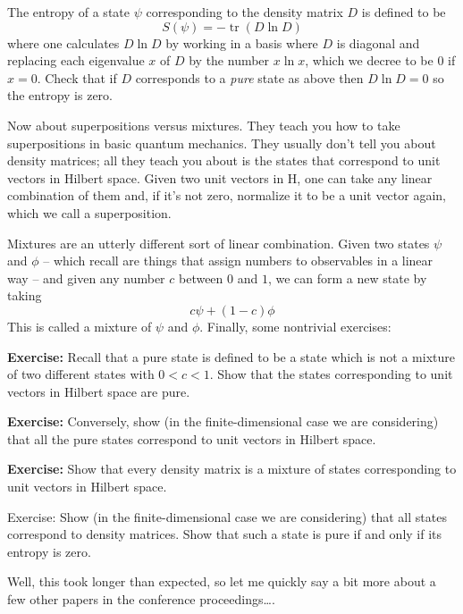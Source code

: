 \documentclass[12pt]{article}
\begin{document}
The entropy of a state \(\psi\) corresponding to the density matrix
\(D\) is defined to be \[S(\psi) = -\operatorname{tr}(D \ln D)\] where
one calculates \(D \ln D\) by working in a basis where \(D\) is diagonal
and replacing each eigenvalue \(x\) of \(D\) by the number \(x \ln x\),
which we decree to be \(0\) if \(x = 0\). Check that if \(D\)
corresponds to a \emph{pure} state as above then \(D \ln D = 0\) so the
entropy is zero.

Now about superpositions versus mixtures. They teach you how to take
superpositions in basic quantum mechanics. They usually don't tell you
about density matrices; all they teach you about is the states that
correspond to unit vectors in Hilbert space. Given two unit vectors in
H, one can take any linear combination of them and, if it's not zero,
normalize it to be a unit vector again, which we call a superposition.

Mixtures are an utterly different sort of linear combination. Given two
states \(\psi\) and \(\phi\) -- which recall are things that assign
numbers to observables in a linear way -- and given any number \(c\)
between \(0\) and \(1\), we can form a new state by taking
\[c \psi + (1-c) \phi\] This is called a mixture of \(\psi\) and
\(\phi\). Finally, some nontrivial exercises:

\textbf{Exercise:} Recall that a pure state is defined to be a state
which is not a mixture of two different states with \(0 < c < 1\). Show
that the states corresponding to unit vectors in Hilbert space are pure.

\textbf{Exercise:} Conversely, show (in the finite-dimensional case we
are considering) that all the pure states correspond to unit vectors in
Hilbert space.

\textbf{Exercise:} Show that every density matrix is a mixture of states
corresponding to unit vectors in Hilbert space.

Exercise: Show (in the finite-dimensional case we are considering) that
all states correspond to density matrices. Show that such a state is
pure if and only if its entropy is zero.

Well, this took longer than expected, so let me quickly say a bit more
about a few other papers in the conference proceedings\ldots.
\end{document}
